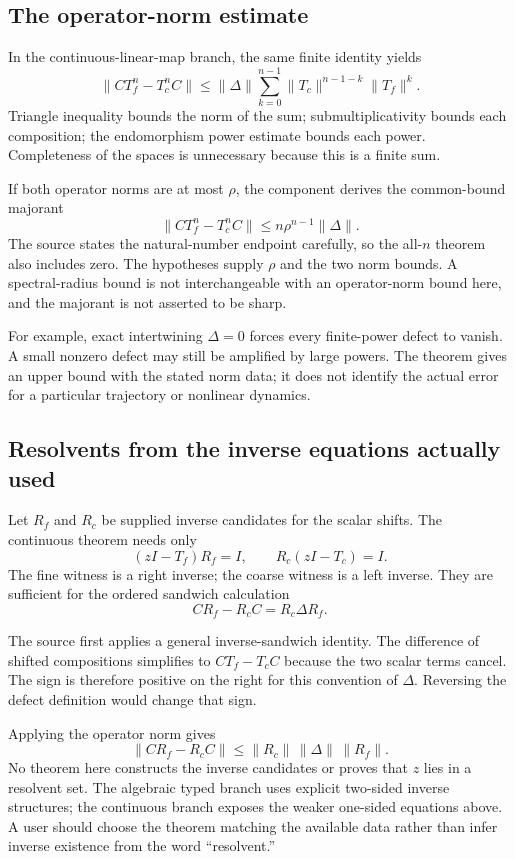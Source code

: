 \subsection{The operator-norm estimate}

In the continuous-linear-map branch, the same finite identity yields
\[
\|CT_f^n-T_c^nC\|
\le \|\Delta\|\sum_{k=0}^{n-1}
\|T_c\|^{n-1-k}\|T_f\|^k.
\]
Triangle inequality bounds the norm of the sum; submultiplicativity bounds each composition; the endomorphism power estimate bounds each power. Completeness of the spaces is unnecessary because this is a finite sum.

If both operator norms are at most $\rho$, the component derives the common-bound majorant
\[
\|CT_f^n-T_c^nC\|\le n\rho^{n-1}\|\Delta\|.
\]
The source states the natural-number endpoint carefully, so the all-$n$ theorem also includes zero. The hypotheses supply $\rho$ and the two norm bounds. A spectral-radius bound is not interchangeable with an operator-norm bound here, and the majorant is not asserted to be sharp.

For example, exact intertwining $\Delta=0$ forces every finite-power defect to vanish. A small nonzero defect may still be amplified by large powers. The theorem gives an upper bound with the stated norm data; it does not identify the actual error for a particular trajectory or nonlinear dynamics.

\subsection{Resolvents from the inverse equations actually used}

Let $R_f$ and $R_c$ be supplied inverse candidates for the scalar shifts. The continuous theorem needs only
\[
(zI-T_f)R_f=I,\qquad R_c(zI-T_c)=I.
\]
The fine witness is a right inverse; the coarse witness is a left inverse. They are sufficient for the ordered sandwich calculation
\[
CR_f-R_cC=R_c\Delta R_f.
\]

The source first applies a general inverse-sandwich identity. The difference of shifted compositions simplifies to $CT_f-T_cC$ because the two scalar terms cancel. The sign is therefore positive on the right for this convention of $\Delta$. Reversing the defect definition would change that sign.

Applying the operator norm gives
\[
\|CR_f-R_cC\|\le\|R_c\|\,\|\Delta\|\,\|R_f\|.
\]
No theorem here constructs the inverse candidates or proves that $z$ lies in a resolvent set. The algebraic typed branch uses explicit two-sided inverse structures; the continuous branch exposes the weaker one-sided equations above. A user should choose the theorem matching the available data rather than infer inverse existence from the word ``resolvent.''

